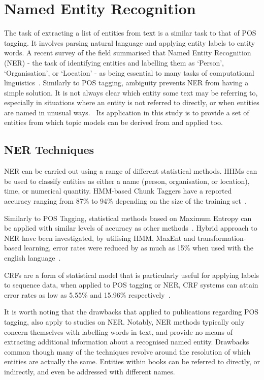\documentclass[10pt]{report}
\begin{document}
\renewcommand{\baselinestretch}{2.0}\normalsize
\renewcommand{\arraystretch}{1.0}

\section{Named Entity Recognition}
The task of extracting a list of entities from text is a similar task to that of POS tagging. It involves parsing natural language and applying entity labels to entity words. A recent survey of the field summarised that Named Entity Recognition (NER) - the task of identifying entities and labelling them as ‘Person’, ‘Organisation’, or ‘Location’ - as being essential to many tasks of computational linguistics~\cite{Nadeau2007-tp}. Similarly to POS tagging, ambiguity prevents NER from having a simple solution. It is not always clear which entity some text may be referring to, especially in situations where an entity is not referred to directly, or when entities are named in unusual ways.~\cite{Ratinov2009-gw} Its application in this study is to provide a set of entities from which topic models can be derived from and applied too. 

\subsection{NER Techniques}
NER can be carried out using a range of different statistical methods. HHMs can be used to classify entities as either a name (person, organisation, or location), time, or numerical quantity. HMM-based Chunk Taggers have a reported accuracy ranging from 87\% to 94\% depending on the size of the training set~\cite{Zhou2002-st}.

Similarly to POS Tagging, statistical methods based on Maximum Entropy can be applied with similar levels of accuracy as other methods~\cite{Borthwick1999-tg,Bender2003-lc}. Hybrid approach to NER have been investigated, by utilising HMM, MaxEnt and transformation-based learning, error rates were reduced by as much as 15\% when used with the english language~\cite{Tjong_Kim2003-ym}.

CRFs are a form of statistical model that is particularly useful for applying labels to sequence data, when applied to POS tagging or NER, CRF systems can attain error rates as low as 5.55\% and 15.96\% respectively~\cite{Lafferty2001-ab,McCallum2003-yu}.

 It is worth noting that the drawbacks that applied to publications regarding POS tagging, also apply to studies on NER. Notably, NER methods typically only concern themselves with labelling words in text, and provide no means of extracting additional information about a recognised named entity. Drawbacks common though many of the techniques revolve around the resolution of which entities are actually the same. Entities within books can be referred to directly, or indirectly, and even be addressed with different names. 
\end{document}
